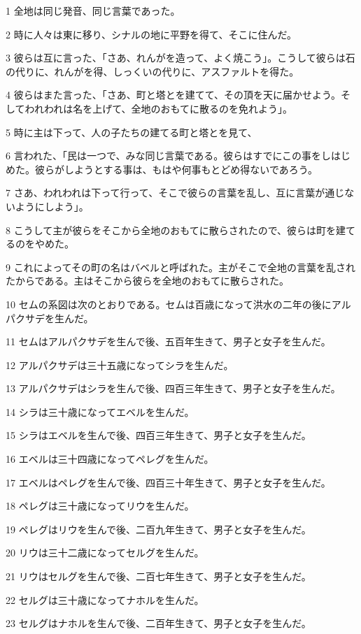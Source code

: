 \par 1 全地は同じ発音、同じ言葉であった。
\par 2 時に人々は東に移り、シナルの地に平野を得て、そこに住んだ。
\par 3 彼らは互に言った、「さあ、れんがを造って、よく焼こう」。こうして彼らは石の代りに、れんがを得、しっくいの代りに、アスファルトを得た。
\par 4 彼らはまた言った、「さあ、町と塔とを建てて、その頂を天に届かせよう。そしてわれわれは名を上げて、全地のおもてに散るのを免れよう」。
\par 5 時に主は下って、人の子たちの建てる町と塔とを見て、
\par 6 言われた、「民は一つで、みな同じ言葉である。彼らはすでにこの事をしはじめた。彼らがしようとする事は、もはや何事もとどめ得ないであろう。
\par 7 さあ、われわれは下って行って、そこで彼らの言葉を乱し、互に言葉が通じないようにしよう」。
\par 8 こうして主が彼らをそこから全地のおもてに散らされたので、彼らは町を建てるのをやめた。
\par 9 これによってその町の名はバベルと呼ばれた。主がそこで全地の言葉を乱されたからである。主はそこから彼らを全地のおもてに散らされた。
\par 10 セムの系図は次のとおりである。セムは百歳になって洪水の二年の後にアルパクサデを生んだ。
\par 11 セムはアルパクサデを生んで後、五百年生きて、男子と女子を生んだ。
\par 12 アルパクサデは三十五歳になってシラを生んだ。
\par 13 アルパクサデはシラを生んで後、四百三年生きて、男子と女子を生んだ。
\par 14 シラは三十歳になってエベルを生んだ。
\par 15 シラはエベルを生んで後、四百三年生きて、男子と女子を生んだ。
\par 16 エベルは三十四歳になってペレグを生んだ。
\par 17 エベルはペレグを生んで後、四百三十年生きて、男子と女子を生んだ。
\par 18 ペレグは三十歳になってリウを生んだ。
\par 19 ペレグはリウを生んで後、二百九年生きて、男子と女子を生んだ。
\par 20 リウは三十二歳になってセルグを生んだ。
\par 21 リウはセルグを生んで後、二百七年生きて、男子と女子を生んだ。
\par 22 セルグは三十歳になってナホルを生んだ。
\par 23 セルグはナホルを生んで後、二百年生きて、男子と女子を生んだ。

